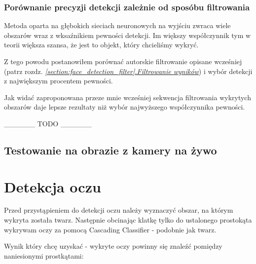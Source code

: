 \documentclass[10pt, a4paper]{article}
\begin{document}
\subsubsection{Porównanie precyzji detekcji zależnie od sposóbu filtrowania}

Metoda oparta na głębokich sieciach neuronowych na wyjściu zwraca wiele obszarów wraz z wksaźnikiem pewności detekcji. Im większy współczynnik tym w teorii większa szansa, że jest to objekt, który chcieliśmy wykryć.
\par
Z tego powodu postanowiłem porównać autorskie filtrowanie opisane wcześniej (patrz rozdz. \hyperref[{section:face_detection_filter}]{\textit{\ref{section:face_detection_filter}.Filtrowanie wyników}}) i wybór detekcji z największym procentem pewności.



Jak widać zaproponowana przeze mnie wcześniej sekwencja filtrowania wykrytych obszarów daje lepsze rezultaty niż wybór najwyższego współczynnika pewności.

\_\_\_\_\_\_ TODO \_\_\_\_\_\_ 



\subsection{Testowanie na obrazie z kamery na żywo}



\section{Detekcja oczu}

Przed przystąpieniem do detekcji oczu należy wyznaczyć obszar, na którym wykryta została twarz. Następnie obcinając klatkę tylko do ustalonego prostokąta wykrywam oczy za pomocą Cascading Classifier - podobnie jak twarz.

Wynik który chcę uzyskać - wykryte oczy powinny się znaleźć pomiędzy naniesionymi prostkątami:
\end{document}
